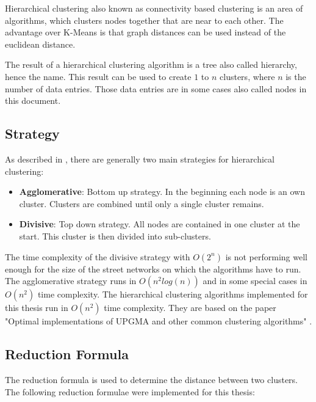 Hierarchical clustering also known as connectivity based clustering is an area of algorithms, which clusters nodes together that are near to each other. The advantage over K-Means is that graph distances can be used instead of the euclidean distance.

The result of a hierarchical clustering algorithm is a tree also called hierarchy, hence the name. This result can be used to create $1$ to $n$ clusters, where $n$ is the number of data entries. Those data entries are in some cases also called nodes in this document.

\subsection{Strategy}
As described in \cite{clustering:2005}, there are generally two main strategies for hierarchical clustering:

\begin{itemize}
    \item \textbf{Agglomerative}: Bottom up strategy. In the beginning each node is an own cluster. Clusters are combined until only a single cluster remains.
    \item \textbf{Divisive}: Top down strategy. All nodes are contained in one cluster at the start. This cluster is then divided into sub-clusters.
\end{itemize}

The time complexity of the divisive strategy with $O(2^n)$ is not performing well enough for the size of the street networks on which the algorithms have to run. The agglomerative strategy runs in $O(n^2 log(n))$ and in some special cases in $O(n^2)$ time complexity. The hierarchical clustering algorithms implemented for this thesis run in $O(n^2)$ time complexity. They are based on the paper "Optimal implementations of UPGMA and other common clustering algorithms" \cite{clustering:2007}.

\subsection{Reduction Formula}
The reduction formula is used to determine the distance between two clusters.
The following reduction formulae were implemented for this thesis:

